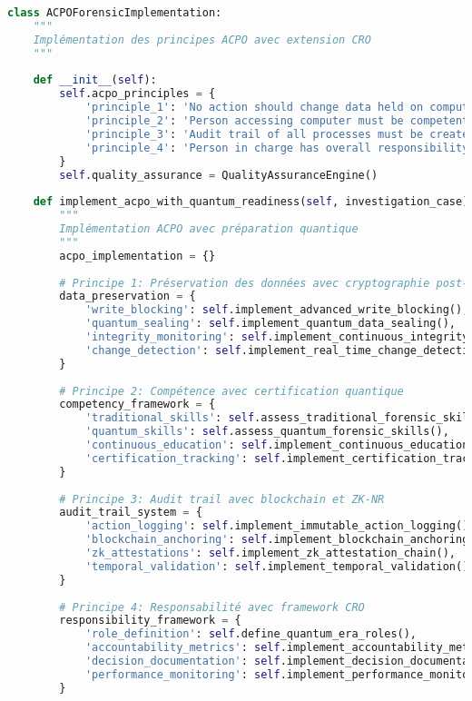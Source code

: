 \begin{lstlisting}[language=Python, caption=Implémentation des principes ACPO avec validation CRO]
class ACPOForensicImplementation:
    """
    Implémentation des principes ACPO avec extension CRO
    """
    
    def __init__(self):
        self.acpo_principles = {
            'principle_1': 'No action should change data held on computer',
            'principle_2': 'Person accessing computer must be competent',
            'principle_3': 'Audit trail of all processes must be created',
            'principle_4': 'Person in charge has overall responsibility'
        }
        self.quality_assurance = QualityAssuranceEngine()
        
    def implement_acpo_with_quantum_readiness(self, investigation_case):
        """
        Implémentation ACPO avec préparation quantique
        """
        acpo_implementation = {}
        
        # Principe 1: Préservation des données avec cryptographie post-quantique
        data_preservation = {
            'write_blocking': self.implement_advanced_write_blocking(),
            'quantum_sealing': self.implement_quantum_data_sealing(),
            'integrity_monitoring': self.implement_continuous_integrity_monitoring(),
            'change_detection': self.implement_real_time_change_detection()
        }
        
        # Principe 2: Compétence avec certification quantique
        competency_framework = {
            'traditional_skills': self.assess_traditional_forensic_skills(),
            'quantum_skills': self.assess_quantum_forensic_skills(),
            'continuous_education': self.implement_continuous_education_program(),
            'certification_tracking': self.implement_certification_tracking()
        }
        
        # Principe 3: Audit trail avec blockchain et ZK-NR
        audit_trail_system = {
            'action_logging': self.implement_immutable_action_logging(),
            'blockchain_anchoring': self.implement_blockchain_anchoring(),
            'zk_attestations': self.implement_zk_attestation_chain(),
            'temporal_validation': self.implement_temporal_validation()
        }
        
        # Principe 4: Responsabilité avec framework CRO
        responsibility_framework = {
            'role_definition': self.define_quantum_era_roles(),
            'accountability_metrics': self.implement_accountability_metrics(),
            'decision_documentation': self.implement_decision_documentation(),
            'performance_monitoring': self.implement_performance_monitoring()
        }
        

\end{lstlisting}
